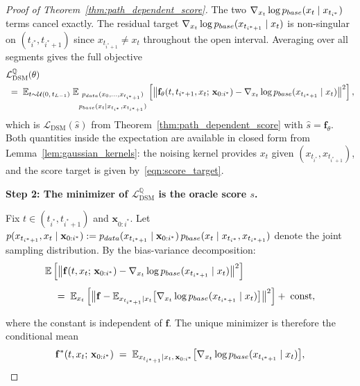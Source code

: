 \documentclass{article}
\newcommand{\pdata}{p_{\normalfont{data}}}
\newcommand{\pbase}{p_{\normalfont{base}}}
\newcommand{\QQ}{\mathbb{Q}}
\newcommand{\EE}{\mathbb{E}}
\begin{document}
\begin{proof}[Proof of Theorem~\ref{thm:path_dependent_score}]
The two $\nabla_{x_t}\log \pbase(x_t \mid x_{t_{i^*}})$ terms cancel exactly.  The residual target $\nabla_{x_t}\log \pbase(x_{t_{i^*+1}} \mid x_t)$ is non-singular on $(t_{i^*}, t_{i^*+1})$ since $x_{t_{i^*+1}} \ne x_t$ throughout the open interval.  Averaging over all segments gives the full objective
\begin{align}
  &\mathcal{L}_\mathrm{DSM}^{\QQ}(\theta) \nonumber \\
  &\;=\;
  \EE_{t \sim \mathcal{U}(0,\,t_{L-1})}\;
  \EE_{\substack{\pdata(x_0, \ldots, x_{t_{i^*+1}}) \\[3pt]
                 \pbase(x_t \mid x_{t_{i^*}}, x_{t_{i^*+1}})}}
  \left[
    \bigl\|
      \mathbf{f}_\theta(t, t_{i^*+1}, x_t;\, \mathbf{x}_{0:i^*})
      - \nabla_{x_t}\log \pbase(x_{t_{i^*+1}} \mid x_t)
    \bigr\|^2
  \right],\label{eqn:loss_final}
\end{align}
which is $\mathcal{L}_\text{DSM}(\hat{s})$ from Theorem~\ref{thm:path_dependent_score} with $\hat{s} = \mathbf{f}_\theta$.  Both quantities inside the expectation are available in closed form from Lemma~\ref{lem:gaussian_kernels}: the noising kernel provides $x_t$ given $(x_{t_{i^*}}, x_{t_{i^*+1}})$, and the score target is given by~\eqref{eqn:score_target}.

\bigskip
\noindent \textbf{Step 2: The minimizer of $\mathcal{L}_\mathrm{DSM}^\QQ$ is the oracle score $s$.}

Fix $t \in (t_{i^*}, t_{i^*+1})$ and $\mathbf{x}_{0:i^*}$.  Let
$p(x_{t_{i^*+1}}, x_t \mid \mathbf{x}_{0:i^*}) := \pdata(x_{t_{i^*+1}} \mid \mathbf{x}_{0:i^*})\,\pbase(x_t \mid x_{t_{i^*}}, x_{t_{i^*+1}})$
denote the joint sampling distribution.  By the bias-variance decomposition:
\begin{align}
  &\EE\left[
    \bigl\|\mathbf{f}(t, x_t;\, \mathbf{x}_{0:i^*})
    - \nabla_{x_t}\log \pbase(x_{t_{i^*+1}} \mid x_t)\bigr\|^2
  \right]
  \nonumber \\[4pt]
  &\quad =\;
  \EE_{x_t}\left[
    \bigl\|\mathbf{f} - \EE_{x_{t_{i^*+1}} \mid x_t}\bigl[\nabla_{x_t}\log \pbase(x_{t_{i^*+1}} \mid x_t)\bigr]\bigr\|^2
  \right]
  +\; \text{const},
  \label{eqn:bias_var}
\end{align}

where the constant is independent of $\mathbf{f}$.  The unique minimizer is therefore the conditional mean
\begin{equation}\label{eqn:minimiser}
  \mathbf{f}^*(t, x_t;\, \mathbf{x}_{0:i^*})
  \;=\;
  \EE_{x_{t_{i^*+1}} \mid x_t,\, \mathbf{x}_{0:i^*}}\bigl[\nabla_{x_t}\log \pbase(x_{t_{i^*+1}} \mid x_t)\bigr],
\end{equation}


\end{proof}
\end{document}

